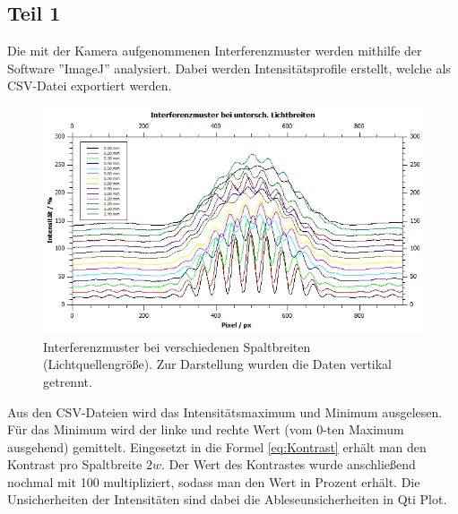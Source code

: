 \documentclass[12pt,a4paper,twoside]{article}
\begin{document}
\subsection{Teil 1}
Die mit der Kamera aufgenommenen Interferenzmuster werden mithilfe der Software ''ImageJ'' analysiert. 
Dabei werden Intensitätsprofile erstellt, welche als CSV-Datei exportiert werden. 

\begin{figure}[H]
    \centering
    \includegraphics[width=0.7\linewidth]{nudes/aufgabe 1 plot.jpg}
    \caption{Interferenzmuster bei verschiedenen Spaltbreiten (Lichtquellengröße). Zur Darstellung wurden die Daten vertikal getrennt. }
    \label{fig:aufgabe 1 plot}
\end{figure}

\noindent
Aus den CSV-Dateien wird das Intensitätsmaximum und Minimum ausgelesen. Für das Minimum wird der linke und rechte Wert (vom 0-ten Maximum ausgehend) gemittelt. Eingesetzt in die Formel \ref{eq:Kontrast} erhält man den Kontrast pro Spaltbreite $2w$. 
Der Wert des Kontrastes wurde anschließend nochmal mit 100 multipliziert, sodass man den Wert in Prozent erhält. 
Die Unsicherheiten der Intensitäten sind dabei die Ableseunsicherheiten in Qti Plot. 
\end{document}
